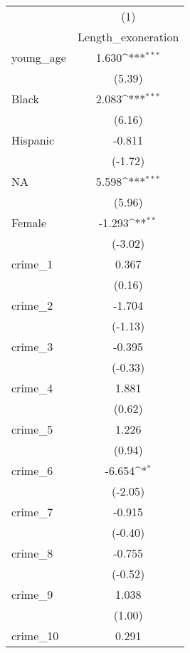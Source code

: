 {
\def\sym#1{\ifmmode^{#1}\else\(^{#1}\)\fi}
\begin{tabular}{l*{1}{c}}
\hline\hline
            &\multicolumn{1}{c}{(1)}\\
            &\multicolumn{1}{c}{Length\_exoneration}\\
\hline
young\_age   &       1.630\sym{***}\\
            &      (5.39)         \\
[1em]
Black       &       2.083\sym{***}\\
            &      (6.16)         \\
[1em]
Hispanic    &      -0.811         \\
            &     (-1.72)         \\
[1em]
NA          &       5.598\sym{***}\\
            &      (5.96)         \\
[1em]
Female      &      -1.293\sym{**} \\
            &     (-3.02)         \\
[1em]
crime\_1     &       0.367         \\
            &      (0.16)         \\
[1em]
crime\_2     &      -1.704         \\
            &     (-1.13)         \\
[1em]
crime\_3     &      -0.395         \\
            &     (-0.33)         \\
[1em]
crime\_4     &       1.881         \\
            &      (0.62)         \\
[1em]
crime\_5     &       1.226         \\
            &      (0.94)         \\
[1em]
crime\_6     &      -6.654\sym{*}  \\
            &     (-2.05)         \\
[1em]
crime\_7     &      -0.915         \\
            &     (-0.40)         \\
[1em]
crime\_8     &      -0.755         \\
            &     (-0.52)         \\
[1em]
crime\_9     &       1.038         \\
            &      (1.00)         \\
[1em]
crime\_10    &       0.291         \\

\end{tabular}}
